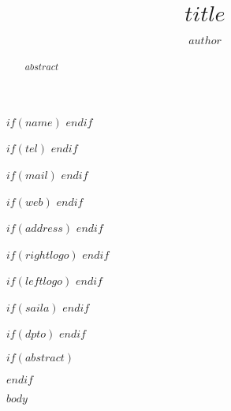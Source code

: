 \documentclass[$if(classoptions)$$classoptions$$endif$]{ifreport}
\begin{document}
\title{$title$}
\author{$author$}

$if(name)$
$endif$

$if(tel)$
$endif$

$if(mail)$
$endif$

$if(web)$
$endif$

$if(address)$
$endif$

$if(rightlogo)$
$endif$


$if(leftlogo)$
$endif$

$if(saila)$
$endif$

$if(dpto)$
$endif$

\maketitle
$if(abstract)$
\begin{abstract}
$abstract$
\end{abstract}
$endif$


$body$
\end{document}
